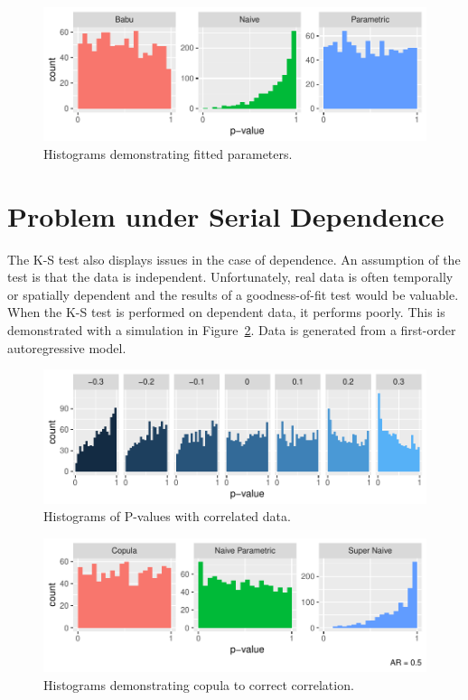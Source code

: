 \documentclass[12pt, letterpaper, titlepage]{article}
\begin{document}
\begin{figure}[tbp]
  \centering
  \includegraphics{hist_fitted}
  \caption{Histograms demonstrating fitted parameters.}
  \label{fig:hist_fitted}
\end{figure}

\hypertarget{sec:correlation}{%
\section{Problem under Serial Dependence}\label{sec:correlation}}

The K-S test also displays issues in the case of dependence. An assumption of the 
test is that the data is independent. Unfortunately, real data is often temporally
or spatially dependent and the results of a goodness-of-fit test would be valuable. 
When the K-S test is performed on dependent data, it performs poorly. This is demonstrated
with a simulation in Figure~\ref{fig:hist_correlation}. Data is generated from a
first-order autoregressive model.

\begin{figure}[tbp]
  \centering
  \includegraphics{hist_correlation}
  \caption{Histograms of P-values with correlated data.}
  \label{fig:hist_correlation}
\end{figure}

\begin{figure}[tbp]
  \centering
  \includegraphics{hist_copula}
  \caption{Histograms demonstrating copula to correct correlation.}
  \label{fig:hist_copula}
\end{figure}
\end{document}
